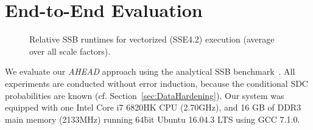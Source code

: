 
\section{End-to-End Evaluation}
\label{sec:SSBEval}

\begin{figure*}[t!]%
	\centering
	\footnotesize
	\graphicspath{{results/ssb/report/}}
	\begin{subfigure}[t]{6.5in}
		
	\end{subfigure}
	\vspace{-0.3cm}
	\caption{Relative SSB runtimes for vectorized (SSE4.2) execution (average over all scale factors).}%
	\label{fig:eval:runtime}%
	\vspace{-0.4cm}
\end{figure*}

We evaluate our \emph{AHEAD} approach using the analytical SSB benchmark~\cite{oneil2009ssbm}. All experiments are conducted without error induction, because the conditional SDC probabilities are known (cf. Section~\ref{sec:DataHardening}). Our system was equipped with one Intel\textsuperscript{\textregistered} Core\textsuperscript{\texttrademark} i7 6820HK CPU (\textat 2.70GHz), and 16 GB of DDR3 main memory (\textat 2133MHz) running 64\=bit Ubuntu 16.04.3 LTS using GCC 7.1.0.



